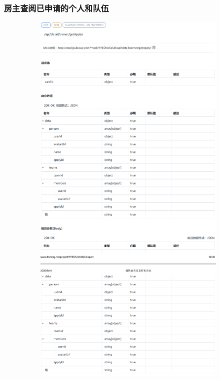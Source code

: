                         \subsubsection{房主查阅已申请的个人和队伍} 
                        \begin{figure}[h]
                            \centering
                            \includegraphics[height=19.0cm,width=14.0cm]{design/image/api12.png} 
                            \end{figure}  
                            \newpage    

